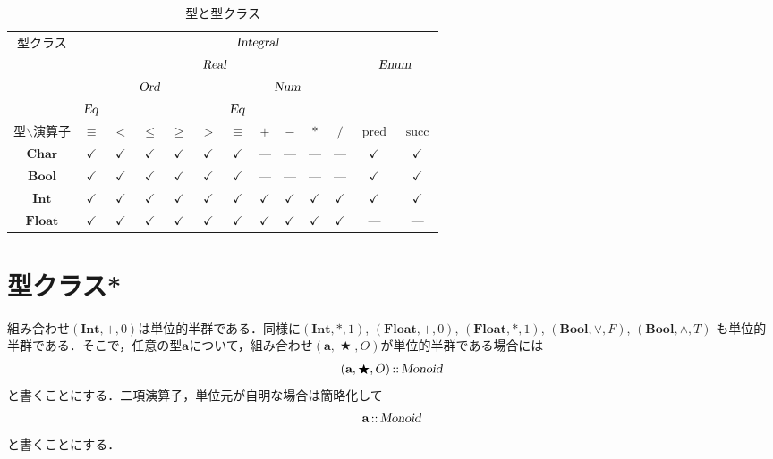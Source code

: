 \documentclass[twocolumn]{jsbook}
\newcommand{\hsklType}[1]{\textbf{#1}}
\newcommand{\hsklTypeclass}[1]{\textsl{#1}}
\DeclareMathOperator{\hsklPred}{pred}
\DeclareMathOperator{\hsklSucc}{succ}
\newcommand{\hsklBool}{\hsklType{Bool}}
\newcommand{\hsklChar}{\hsklType{Char}}
\newcommand{\hsklEnum}{\hsklTypeclass{Enum}}
\newcommand{\hsklInt}{\hsklType{Int}}
\newcommand{\hsklIntegral}{\hsklTypeclass{Integral}}
\newcommand{\hsklEq}{\hsklTypeclass{Eq}}
\newcommand{\hsklFloat}{\hsklType{Float}}
\newcommand{\hsklMonoid}{\hsklTypeclass{Monoid}}
\newcommand{\hsklNum}{\hsklTypeclass{Num}}
\newcommand{\hsklOrd}{\hsklTypeclass{Ord}}
\newcommand{\hsklReal}{\hsklTypeclass{Real}}
\DeclareMathOperator{\mathAnyBinaryOperator}{\bigstar}
\DeclareMathOperator{\mathIn}{::}
\newcommand{\mathMonoid}[3]{(#1,#2,#3)}
\begin{document}
\begin{table*}
\caption{型と型クラス}
\label{tab:type-and-typeclass}
\begin{center}
\begin{tabular}{||c||c|c|c|c|c|c|c|c|c|c|c|c||}
\hline
\multirow{4}{*}{型クラス}
    &\multicolumn{12}{|c||}{$\hsklIntegral$}\\
\cline{2-13}
\multirow{3}{*}{}
    &\multicolumn{10}{|c|}{$\hsklReal$}
    &\multicolumn{2}{|c||}{$\hsklEnum$}\\
\cline{2-11}
\multirow{2}{*}{}
    &\multicolumn{5}{|c|}{$\hsklOrd$}
    &\multicolumn{5}{|c|}{$\hsklNum$}
    &\multicolumn{2}{|c||}{ }\\
\cline{2-2}\cline{7-7}
{ }
    &$\hsklEq$
    &\multicolumn{4}{|c|}{ }
    &$\hsklEq$
    &\multicolumn{4}{|c|}{ }
    &\multicolumn{2}{|c||}{ }\\
\hline\hline
型$\backslash$演算子
    &$\equiv$
    &$<$
    &$\le$
    &$\ge$
    &$>$
    &$\equiv$
    &$+$
    &$-$
    &$*$
    &$/$
    &$\hsklPred$
    &$\hsklSucc$\\
\hline
$\hsklChar$
    &$\checkmark$
    &$\checkmark$
    &$\checkmark$
    &$\checkmark$
    &$\checkmark$
    &$\checkmark$
    &---
    &---
    &---
    &---
    &$\checkmark$
    &$\checkmark$\\
\hline
$\hsklBool$
    &$\checkmark$
    &$\checkmark$
    &$\checkmark$
    &$\checkmark$
    &$\checkmark$
    &$\checkmark$
    &---
    &---
    &---
    &---
    &$\checkmark$
    &$\checkmark$\\
\hline
$\hsklInt$
    &$\checkmark$
    &$\checkmark$
    &$\checkmark$
    &$\checkmark$
    &$\checkmark$
    &$\checkmark$
    &$\checkmark$
    &$\checkmark$
    &$\checkmark$
    &$\checkmark$
    &$\checkmark$
    &$\checkmark$\\
\hline
$\hsklFloat$
    &$\checkmark$
    &$\checkmark$
    &$\checkmark$
    &$\checkmark$
    &$\checkmark$
    &$\checkmark$
    &$\checkmark$
    &$\checkmark$
    &$\checkmark$
    &$\checkmark$
    &---
    &---\\
\hline
\end{tabular}
\end{center}
\end{table*}

\section{型クラス*}

組み合わせ$\mathMonoid{\hsklInt}{+}{0}$は単位的半群である．同様に$\mathMonoid{\hsklInt}{*}{1}$, $\mathMonoid{\hsklFloat}{+}{0}$, $\mathMonoid{\hsklFloat}{*}{1}$, $\mathMonoid{\hsklBool}{\vee}{F}$, $\mathMonoid{\hsklBool}{\wedge}{T}$ も単位的半群である．そこで，任意の型$\hsklType{a}$について，組み合わせ$\mathMonoid{\hsklType{a}}{\mathAnyBinaryOperator}{O}$が単位的半群である場合には$$\mathMonoid{\hsklType{a}}{\mathAnyBinaryOperator}{O}\mathIn\hsklMonoid$$と書くことにする．二項演算子，単位元が自明な場合は簡略化して$$\hsklType{a}\mathIn\hsklMonoid$$と書くことにする．
\end{document}
